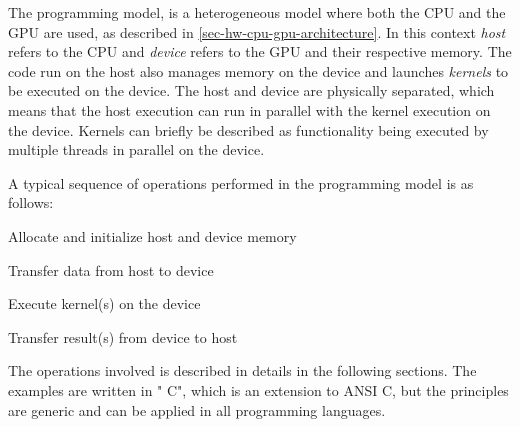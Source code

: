 The \cuda{} programming model, is a heterogeneous model where both the CPU and the GPU are used, as described in \autoref{sec-hw-cpu-gpu-architecture}.
In this context \textit{host} refers to the CPU and \textit{device} refers to the GPU and their respective memory.
The code run on the host also manages memory on the device and launches \textit{kernels} to be executed on the device.
The host and device are physically separated, which means that the host execution can run in parallel with the kernel execution on the device.
Kernels can briefly be described as functionality being executed by multiple threads in parallel on the device.

\noindent A typical sequence of operations performed in the \cuda{} programming model is as follows:
\begin{enumerateSmall}
	\item Allocate and initialize host and device memory
	\item Transfer data from host to device
	\item Execute kernel(s) on the device
	\item Transfer result(s) from device to host
\end{enumerateSmall}
The operations involved is described in details in the following sections.
The \cuda{} examples are written in "\cuda{} C", which is an extension to ANSI C, but the principles are generic and can be applied in all \cuda{} programming languages.
